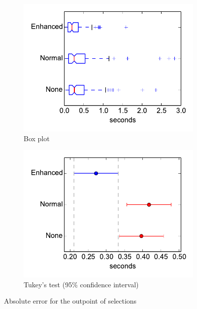 \begin{figure}[ht]
\centering
\begin{subfigure}{.5\textwidth}
  \centering
  \includegraphics[width=\textwidth]{figs/outpoint-abserr.pdf}
  \caption{Box plot}
  \label{fig:outpointerrbox}
\end{subfigure}%
\begin{subfigure}{.5\textwidth}
  \centering
  \includegraphics[width=\linewidth]{figs/outpoint-abserr-tukey95.pdf}
  \caption{Tukey's test (95\% confidence interval)}
  \label{fig:outpointerrtukey}
\end{subfigure}
\caption{Absolute error for the outpoint of selections}
\label{fig:outpointerr}
\end{figure}

